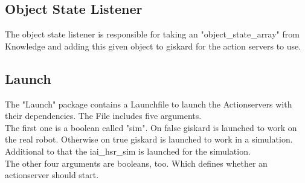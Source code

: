 \documentclass[main.tex]{subfiles}
\begin{document}
	\vspace{1cm}
	
	\subsection{Object State Listener}
	The object state listener is responsible for taking an "object\_state\_array" from Knowledge and adding this given object to giskard for the action servers to use.
	
	\vspace{1cm}
	
	\subsection{Launch}
	The "Launch" package contains a Launchfile to launch the Actionservers with their dependencies. The File includes five arguments.\\
	The first one is a boolean called "sim". On false giskard is launched to work on the real robot. Otherwise on true giskard is launched to work in a simulation. Additional to that the iai\_hsr\_sim is launched for the simulation.\\
	The other four arguments are booleans, too. Which defines whether an actionserver should start. 
\end{document}
